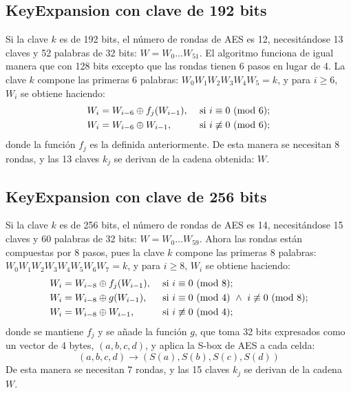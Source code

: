 \subsection{KeyExpansion con clave de 192 bits}
Si la clave $k$ es de 192 bits, el número de rondas de AES es 12, necesitándose 13 claves y 52 palabras de 32 bits: $W = W_0\ldots W_{51}$. El algoritmo funciona de igual manera que con 128 bits excepto que las rondas tienen 6 pasos en lugar de 4. La clave $k$ compone las primeras 6 palabras: $W_0W_1W_2W_3W_4W_5 = k$, y para $i\geq6$, $W_i$ se obtiene haciendo:
\begin{align*}
    &&W_i &= W_{i-6}  \oplus f_j(W_{i-1}), &&\text{ si } i \equiv 0 \text{ (mod }6);&&\\
    &&W_i &= W_{i-6}  \oplus W_{i-1}, &&\text{ si } i \not\equiv 0 \text{ (mod }6);&&
\end{align*}
donde la función $f_j$ es la definida anteriormente. De esta manera se necesitan 8 rondas, y las 13 claves $k_j$ se derivan de la cadena obtenida: $W$.

\vspace{-0.5em}
\subsection{KeyExpansion con clave de 256 bits}
Si la clave $k$ es de 256 bits, el número de rondas de AES es 14, necesitándose 15 claves y 60 palabras de 32 bits: $W = W_0\ldots W_{59}$. Ahora las rondas están compuestas por 8 pasos, pues la clave $k$ compone las primeras 8 palabras: $W_0W_1W_2W_3W_4W_5W_6W_7 = k$, y para $i\geq8$, $W_i$ se obtiene haciendo:
\begin{align*}
    &&W_i &= W_{i-8}  \oplus f_j(W_{i-1}), &&\text{ si } i \equiv 0 \text{ (mod }8);&&\\
    &&W_i &= W_{i-8}  \oplus g(W_{i-1}), &&\text{ si } i \equiv 0 \text{ (mod }4) \ \land\ i \not\equiv 0 \text{ (mod }8);&&\\
    &&W_i &= W_{i-8}  \oplus W_{i-1}, &&\text{ si } i \not\equiv 0 \text{ (mod }4);&&
\end{align*}
donde se mantiene $f_j$ y se añade la función $g$, que toma 32 bits expresados como un vector de 4 bytes, $(a,b,c,d)$, y aplica la S-box de AES a cada celda:\vspace{-0.5em}
\[(a,b,c,d) \to (S(a),S(b),S(c),S(d))\]
De esta manera se necesitan 7 rondas, y las 15 claves $k_j$ se derivan de la cadena $W$.